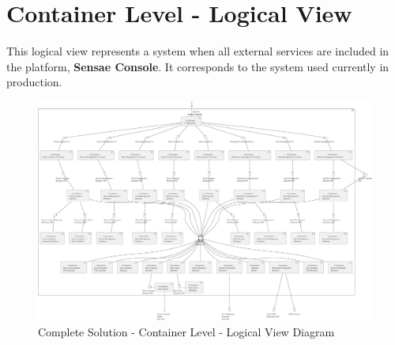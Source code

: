 \chapter{Container Level - Logical View}
\label{AppendixB}

This logical view represents a system when all external services are included in the platform, \textbf{Sensae Console}. It corresponds to the system used currently in production.

\begin{figure}
   \centering
   \includegraphics[page=1,width=0.8\columnwidth]{assets/diagrams/design/architectural/level2/logical/complete.pdf}
   \caption[Complete Solution - Container Level - Logical View Diagram]{Complete Solution - Container Level - Logical View Diagram}
   \label{fig:AppendixB:complete}
\end{figure}
